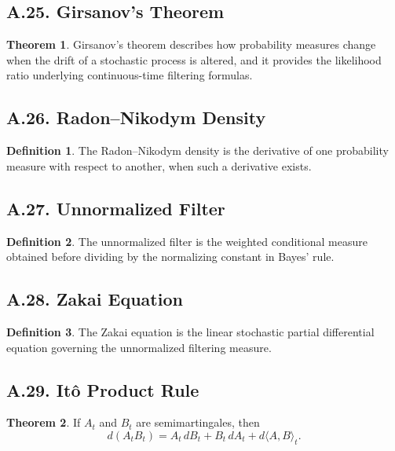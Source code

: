 \documentclass[11pt]{article}
\theoremstyle{definition}
\newtheorem{definition}{Definition}
\newtheorem{theorem}{Theorem}
\theoremstyle{remark}
\begin{document}
\subsection*{A.25. Girsanov's Theorem}
\begin{theorem}
Girsanov's theorem describes how probability measures change when the drift of a stochastic process is altered, and it provides the likelihood ratio underlying continuous-time filtering formulas.
\end{theorem}

\subsection*{A.26. Radon--Nikodym Density}
\begin{definition}
The Radon--Nikodym density is the derivative of one probability measure with respect to another, when such a derivative exists.
\end{definition}

\subsection*{A.27. Unnormalized Filter}
\begin{definition}
The unnormalized filter is the weighted conditional measure obtained before dividing by the normalizing constant in Bayes' rule.
\end{definition}

\subsection*{A.28. Zakai Equation}
\begin{definition}
The Zakai equation is the linear stochastic partial differential equation governing the unnormalized filtering measure.
\end{definition}

\subsection*{A.29. It\^o Product Rule}
\begin{theorem}
If \(A_t\) and \(B_t\) are semimartingales, then
\[
d(A_tB_t)=A_t\,dB_t+B_t\,dA_t+d\langle A,B\rangle_t.
\]
\end{theorem}
\end{document}
